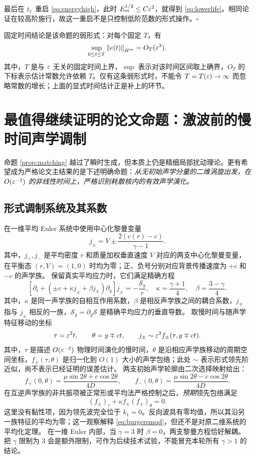 最后在 $t_\varepsilon$ 重启 \eqref{eq:energyhigh}，此时 $E_m^{1/2}\le C\varepsilon^2$，就得到 \eqref{eq:lowerlife}。相同论证在较高阶施行，故这一重启不是只控制低阶范数的形式操作。\hfill$\square$

固定时间结论是该命题的弱形式：对每个固定 $T$，有
\[
 \sup_{0\le t\le T}\left\|e(t)\right\|_{H^m}=O_T(\varepsilon^3).
\]
其中，$T$ 是与 $\varepsilon$ 无关的固定时间上界，$\sup$ 表示对该时间区间取上确界，$O_T$ 的下标表示估计常数允许依赖 $T$。仅有这条弱形式时，不能令 $T=T(\varepsilon)\to\infty$ 而忽略常数的增长；上面的显式时间估计正是补上的环节。

\section{最值得继续证明的论文命题：激波前的慢时间声学调制}
命题 \ref{prop:matching} 越过了瞬时生成，但本质上仍是精细局部扰动理论。更有希望成为严格论文主结果的是下述明确命题：\emph{从无初始声学分量的二维涡旋出发，在 $O(\varepsilon^{-2})$ 的非线性时间上，严格识别耗散核内的有效声学演化。}

\subsection{形式调制系统及其系数}
在一维平均 Euler 系统中使用中心化黎曼变量
\[
 j_\pm=V\pm\frac{2(c(r)-c)}{\gamma-1}.
\]
其中，$j_+,j_-$ 是平均密度 $r$ 和质量加权垂直速度 $V$ 对应的两支中心化黎曼变量，在平衡态 $(r,V)=(1,0)$ 时均为零；正、负号分别对应背景传播速度为 $+c$ 和 $-c$ 的声学族。
保留真实平均应力时，它们满足精确方程
\begin{equation}\label{eq:riemannforced}
 \left[\partial_t+\left(\pm c+\kappa j_\pm+\beta j_\mp\right)\partial_y\right]j_\pm
 =-\frac{\mathcal S_y}{r},\quad
 \kappa=\frac{\gamma+1}{4},\quad\beta=\frac{3-\gamma}{4}.
\end{equation}
其中，$\kappa$ 是同一声学族的自相互作用系数，$\beta$ 是相反声学族之间的耦合系数，$j_\mp$ 指与 $j_\pm$ 相反的一族，$\mathcal S_y=\partial_y\mathcal S$ 是精确平均应力的垂直导数。
取慢时间与随声学特征移动的坐标
\[
 \tau=\varepsilon^2t,\qquad \theta=y\mp ct,\qquad
 j_\pm\sim\varepsilon^2f_\pm(\tau,y\mp ct).
\]
其中，$\tau$ 是描述 $O(\varepsilon^{-2})$ 物理时间演化的慢时间，$\theta$ 是沿相应声学族移动的周期空间坐标，$f_\pm(\tau,\theta)$ 是归一化到 $O(1)$ 大小的声学包络；此处 $\sim$ 表示形式领先阶近似，尚不表示已经证明的误差估计。
两支初始声学轮廓由二次选择映射给出：
\[
 f_+(0,\theta)=\frac{\mu\sin2\theta+c\cos2\theta}{4D},\qquad
 f_-(0,\theta)=\frac{\mu\sin2\theta-c\cos2\theta}{4D}.
\]
在互逆声学族的非共振项被正常形或平均法严格控制之后，\emph{预期}领先包络满足
\begin{equation}\label{eq:burgersmod}
 (f_\pm)_\tau+\kappa f_\pm(f_\pm)_\theta=0.
\end{equation}
这里没有黏性项，因为领先波完全位于 $k_1=0$。反向波具有零均值，所以其沿另一族特征的平均为零；这一观察解释 \eqref{eq:burgersmod}，但还不是对原二维系统的平均化定理。
在一维 Euler 内部，当 $\gamma=3$ 时 $\beta=0$，两支黎曼方程恰好解耦。把 $\gamma$ 限制为 $3$ 会是额外限制，可作为后续技术试验，不能冒充本轮所有 $\gamma>1$ 的结论。

